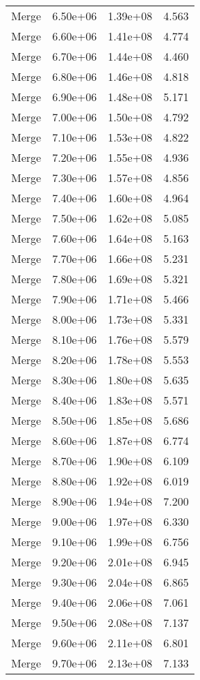 \begin{table}
\begin{tabular}{llll}
Merge & 6.50e+06 & 1.39e+08 & 4.563 \\
Merge & 6.60e+06 & 1.41e+08 & 4.774 \\
Merge & 6.70e+06 & 1.44e+08 & 4.460 \\
Merge & 6.80e+06 & 1.46e+08 & 4.818 \\
Merge & 6.90e+06 & 1.48e+08 & 5.171 \\
Merge & 7.00e+06 & 1.50e+08 & 4.792 \\
Merge & 7.10e+06 & 1.53e+08 & 4.822 \\
Merge & 7.20e+06 & 1.55e+08 & 4.936 \\
Merge & 7.30e+06 & 1.57e+08 & 4.856 \\
Merge & 7.40e+06 & 1.60e+08 & 4.964 \\
Merge & 7.50e+06 & 1.62e+08 & 5.085 \\
Merge & 7.60e+06 & 1.64e+08 & 5.163 \\
Merge & 7.70e+06 & 1.66e+08 & 5.231 \\
Merge & 7.80e+06 & 1.69e+08 & 5.321 \\
Merge & 7.90e+06 & 1.71e+08 & 5.466 \\
Merge & 8.00e+06 & 1.73e+08 & 5.331 \\
Merge & 8.10e+06 & 1.76e+08 & 5.579 \\
Merge & 8.20e+06 & 1.78e+08 & 5.553 \\
Merge & 8.30e+06 & 1.80e+08 & 5.635 \\
Merge & 8.40e+06 & 1.83e+08 & 5.571 \\
Merge & 8.50e+06 & 1.85e+08 & 5.686 \\
Merge & 8.60e+06 & 1.87e+08 & 6.774 \\
Merge & 8.70e+06 & 1.90e+08 & 6.109 \\
Merge & 8.80e+06 & 1.92e+08 & 6.019 \\
Merge & 8.90e+06 & 1.94e+08 & 7.200 \\
Merge & 9.00e+06 & 1.97e+08 & 6.330 \\
Merge & 9.10e+06 & 1.99e+08 & 6.756 \\
Merge & 9.20e+06 & 2.01e+08 & 6.945 \\
Merge & 9.30e+06 & 2.04e+08 & 6.865 \\
Merge & 9.40e+06 & 2.06e+08 & 7.061 \\
Merge & 9.50e+06 & 2.08e+08 & 7.137 \\
Merge & 9.60e+06 & 2.11e+08 & 6.801 \\
Merge & 9.70e+06 & 2.13e+08 & 7.133 \\

\end{tabular}
\end{table}
